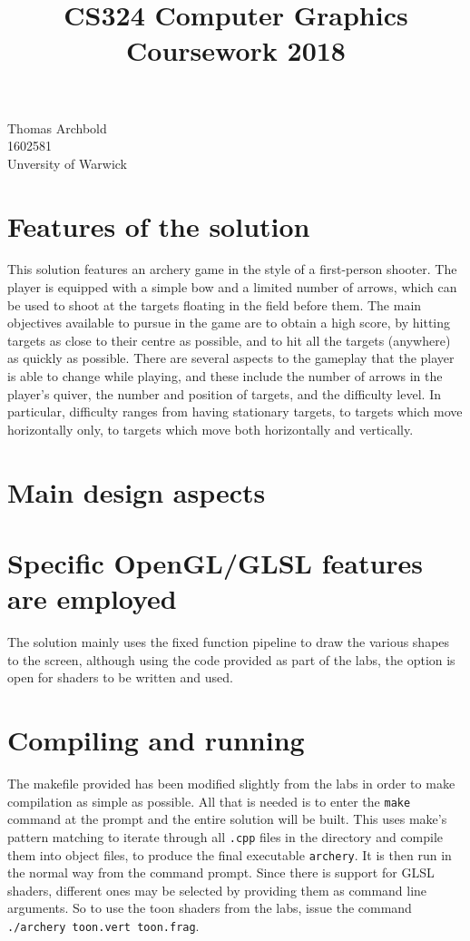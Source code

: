 \documentclass[8pt]{article}
\title{CS324 Computer Graphics Coursework 2018}
\begin{document}
\maketitle

\begin{center}
    Thomas Archbold \\
    1602581 \\
    Unversity of Warwick
\end{center}

\section*{Features of the solution}
This solution features an archery game in the style of a first-person shooter.
The player is equipped with a simple bow and a limited number of arrows, which
can be used to shoot at the targets floating in the field before them. The main
objectives available to pursue in the game are to obtain a high score, by
hitting targets as close to their centre as possible, and to hit all the targets
(anywhere) as quickly as possible. There are several aspects to the gameplay
that the player is able to change while playing, and these include the number of
arrows in the player's quiver, the number and position of targets, and the
difficulty level. In particular, difficulty ranges from having stationary
targets, to targets which move horizontally only, to targets which move both
horizontally and vertically.

\section*{Main design aspects}

\section*{Specific OpenGL/GLSL features are employed}
The solution mainly uses the fixed function pipeline to draw the various shapes
to the screen, although using the code provided as part of the labs, the option
is open for shaders to be written and used. 

\section*{Compiling and running}
The makefile provided has been modified slightly from the labs in order to make
compilation as simple as possible. All that is needed is to enter the
\texttt{make} command at the prompt and the entire solution will be built. This
uses make's pattern matching to iterate through all \texttt{.cpp} files in the
directory and compile them into object files, to produce the final executable
\texttt{archery}. It is then run in the normal way from the command prompt.
Since there is support for GLSL shaders, different ones may be selected by
providing them as command line arguments. So to use the toon shaders from the
labs, issue the command \texttt{./archery toon.vert toon.frag}.
\end{document}
